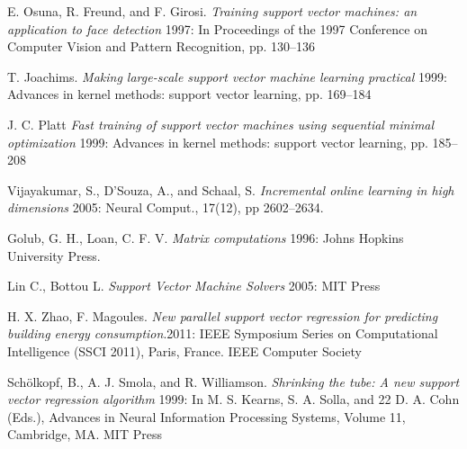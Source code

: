 \documentclass[12pt]{article}
\begin{document}
\begin{thebibliography}{}
E. Osuna, R. Freund, and F. Girosi. {\em Training support vector machines: an application to face detection} 1997: In Proceedings of the 1997 Conference on Computer Vision and Pattern Recognition, pp. 130–136

T. Joachims. {\em Making large-scale support vector machine learning practical} 1999: Advances in kernel methods: support vector learning, pp. 169–184

J. C. Platt {\em Fast training of support vector machines using sequential minimal optimization} 1999: Advances in kernel methods: support vector learning, pp. 185–208

Vijayakumar, S., D’Souza, A., and Schaal, S. {\em Incremental online learning in high dimensions} 2005: Neural Comput., 17(12), pp 2602–2634.

 Golub, G. H., Loan, C. F. V. {\em Matrix computations} 1996: Johns Hopkins University Press.

Lin C., Bottou L. {\em Support Vector Machine Solvers} 2005: MIT Press

H. X. Zhao, F. Magoules. {\em New parallel support vector regression for predicting building energy consumption}.2011: IEEE Symposium Series on Computational Intelligence (SSCI 2011), Paris, France. IEEE Computer Society

Sch\"olkopf, B., A. J. Smola, and R. Williamson. {\em Shrinking the tube: A new support vector regression algorithm} 1999: In M. S. Kearns, S. A. Solla, and 22 D. A. Cohn (Eds.), Advances in Neural Information Processing Systems, Volume 11, Cambridge, MA. MIT Press

  \end{thebibliography}
 
\end{document}
